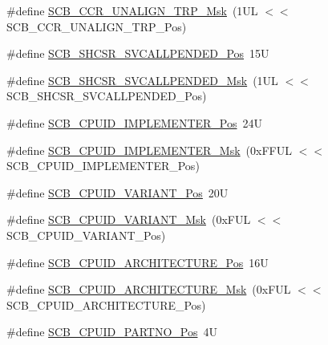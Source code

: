 \begin{DoxyCompactItemize}
\item 
\#define \hyperlink{group___c_m_s_i_s___s_c_b_ga68c96ad594af70c007923979085c99e0}{S\+C\+B\+\_\+\+C\+C\+R\+\_\+\+U\+N\+A\+L\+I\+G\+N\+\_\+\+T\+R\+P\+\_\+\+Msk}~(1\+U\+L $<$$<$ S\+C\+B\+\_\+\+C\+C\+R\+\_\+\+U\+N\+A\+L\+I\+G\+N\+\_\+\+T\+R\+P\+\_\+\+Pos)
\item 
\#define \hyperlink{group___c_m_s_i_s___s_c_b_ga2f93ec9b243f94cdd3e94b8f0bf43641}{S\+C\+B\+\_\+\+S\+H\+C\+S\+R\+\_\+\+S\+V\+C\+A\+L\+L\+P\+E\+N\+D\+E\+D\+\_\+\+Pos}~15U
\item 
\#define \hyperlink{group___c_m_s_i_s___s_c_b_ga6095a7acfbad66f52822b1392be88652}{S\+C\+B\+\_\+\+S\+H\+C\+S\+R\+\_\+\+S\+V\+C\+A\+L\+L\+P\+E\+N\+D\+E\+D\+\_\+\+Msk}~(1\+U\+L $<$$<$ S\+C\+B\+\_\+\+S\+H\+C\+S\+R\+\_\+\+S\+V\+C\+A\+L\+L\+P\+E\+N\+D\+E\+D\+\_\+\+Pos)
\item 
\#define \hyperlink{group___c_m_s_i_s___s_c_b_ga58686b88f94f789d4e6f429fe1ff58cf}{S\+C\+B\+\_\+\+C\+P\+U\+I\+D\+\_\+\+I\+M\+P\+L\+E\+M\+E\+N\+T\+E\+R\+\_\+\+Pos}~24U
\item 
\#define \hyperlink{group___c_m_s_i_s___s_c_b_ga0932b31faafd47656a03ced75a31d99b}{S\+C\+B\+\_\+\+C\+P\+U\+I\+D\+\_\+\+I\+M\+P\+L\+E\+M\+E\+N\+T\+E\+R\+\_\+\+Msk}~(0x\+F\+F\+U\+L $<$$<$ S\+C\+B\+\_\+\+C\+P\+U\+I\+D\+\_\+\+I\+M\+P\+L\+E\+M\+E\+N\+T\+E\+R\+\_\+\+Pos)
\item 
\#define \hyperlink{group___c_m_s_i_s___s_c_b_ga104462bd0815391b4044a70bd15d3a71}{S\+C\+B\+\_\+\+C\+P\+U\+I\+D\+\_\+\+V\+A\+R\+I\+A\+N\+T\+\_\+\+Pos}~20U
\item 
\#define \hyperlink{group___c_m_s_i_s___s_c_b_gad358dfbd04300afc1824329d128b99e8}{S\+C\+B\+\_\+\+C\+P\+U\+I\+D\+\_\+\+V\+A\+R\+I\+A\+N\+T\+\_\+\+Msk}~(0x\+F\+U\+L $<$$<$ S\+C\+B\+\_\+\+C\+P\+U\+I\+D\+\_\+\+V\+A\+R\+I\+A\+N\+T\+\_\+\+Pos)
\item 
\#define \hyperlink{group___c_m_s_i_s___s_c_b_gaf8b3236b08fb8e840efb682645fb0e98}{S\+C\+B\+\_\+\+C\+P\+U\+I\+D\+\_\+\+A\+R\+C\+H\+I\+T\+E\+C\+T\+U\+R\+E\+\_\+\+Pos}~16U
\item 
\#define \hyperlink{group___c_m_s_i_s___s_c_b_gafae4a1f27a927338ae9dc51a0e146213}{S\+C\+B\+\_\+\+C\+P\+U\+I\+D\+\_\+\+A\+R\+C\+H\+I\+T\+E\+C\+T\+U\+R\+E\+\_\+\+Msk}~(0x\+F\+U\+L $<$$<$ S\+C\+B\+\_\+\+C\+P\+U\+I\+D\+\_\+\+A\+R\+C\+H\+I\+T\+E\+C\+T\+U\+R\+E\+\_\+\+Pos)
\item 
\#define \hyperlink{group___c_m_s_i_s___s_c_b_ga705f68eaa9afb042ca2407dc4e4629ac}{S\+C\+B\+\_\+\+C\+P\+U\+I\+D\+\_\+\+P\+A\+R\+T\+N\+O\+\_\+\+Pos}~4U
\item 
$$
\end{DoxyCompactItemize}
